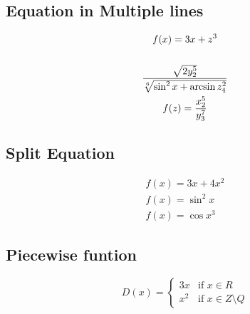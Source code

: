 \documentclass{article}
\begin{document}
    \subsection{Equation in Multiple lines}
    \begin{gather} %
        f(x)=3x+z^3  \\ 
        \notag \\ 
        \frac{\sqrt{2y_2^5}}{\sqrt[6]{\sin^2 x+\arcsin z_4^2}} \notag \\
        f(z)=\frac{x_2^5}{y_3^7}
    \end{gather}

    \subsection{Split Equation}
    \begin{equation} %
        \begin{split} %
            f(x)=3x+4x^2 \\
            f(x)=\sin^2 x \\
            f(x)=\cos x^3 
        \end{split}
    \end{equation}

    \subsection{Piecewise funtion}
    \begin{equation}
        D(x)=\begin{cases}
            3x & \text{if }  x \in R \\
            x^2 & \text{if } x \in Z \setminus Q
        \end{cases}
    \end{equation}
    
\end{document}
